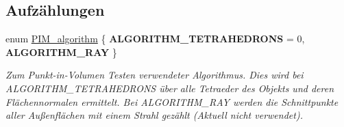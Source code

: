 \subsection*{Aufzählungen}
\begin{DoxyCompactItemize}
\item 
enum \hyperlink{namespaceUtils_ad369b0127cabda0d6871ce1ae7e6c862}{P\-I\-M\-\_\-algorithm} \{ {\bfseries A\-L\-G\-O\-R\-I\-T\-H\-M\-\_\-\-T\-E\-T\-R\-A\-H\-E\-D\-R\-O\-N\-S} = 0, 
{\bfseries A\-L\-G\-O\-R\-I\-T\-H\-M\-\_\-\-R\-A\-Y}
 \}
\begin{DoxyCompactList}\small\item\em Zum Punkt-\/in-\/\-Volumen Testen verwendeter Algorithmus. Dies wird bei A\-L\-G\-O\-R\-I\-T\-H\-M\-\_\-\-T\-E\-T\-R\-A\-H\-E\-D\-R\-O\-N\-S über alle Tetraeder des Objekts und deren Flächennormalen ermittelt. Bei A\-L\-G\-O\-R\-I\-T\-H\-M\-\_\-\-R\-A\-Y werden die Schnittpunkte aller Außenflächen mit einem Strahl gezählt (Aktuell nicht verwendet). \end{DoxyCompactList}\end{DoxyCompactItemize}
